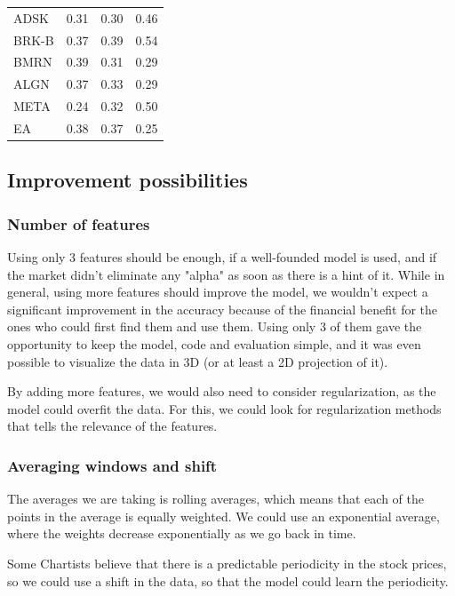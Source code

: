 \documentclass{article}
\begin{document}
\begin{table}
\begin{tabular}{llll}
        ADSK  & 0.31        & 0.30        & 0.46        \\
        BRK-B & 0.37        & 0.39        & 0.54        \\
        BMRN  & 0.39        & 0.31        & 0.29        \\
        ALGN  & 0.37        & 0.33        & 0.29        \\
        META  & 0.24        & 0.32        & 0.50        \\
        EA    & 0.38        & 0.37        & 0.25        \\
        \bottomrule
    \end{tabular}
\end{table}

\subsection{Improvement possibilities}

\subsubsection*{Number of features}
Using only 3 features should be enough, if a well-founded model is used,
and if the market didn't eliminate any "alpha" as soon as there is a hint of it.
While in general, using more features should improve the model,
we wouldn't expect a significant improvement in the accuracy
because of the financial benefit for the ones who could first find them and use them.
Using only 3 of them gave the opportunity to keep the model, code and evaluation simple,
and it was even possible to visualize the data in 3D (or at least a 2D projection of it).

By adding more features, we would also need to consider regularization,
as the model could overfit the data. For this, we could look for regularization methods
that tells the relevance of the features.

\subsubsection*{Averaging windows and shift}
The averages we are taking is rolling averages, which means that each of the
points in the average is equally weighted. We could use an exponential average,
where the weights decrease exponentially as we go back in time.

Some Chartists believe that there is a predictable periodicity in the stock prices,
so we could use a shift in the data, so that the model could learn the periodicity.
\end{document}
